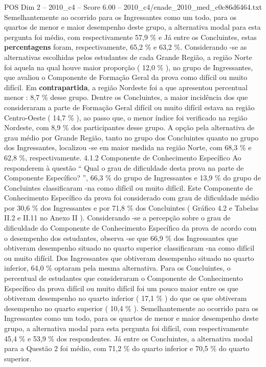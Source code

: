 \begin{textsample}{POS Dim 2 – 2010\_c4 – Score 6.00 – 2010\_c4/enade\_2010\_med\_c0c86d6464.txt}
Semelhantemente ao ocorrido para os Ingressantes como um todo, para os quartos de menor e maior desempenho deste grupo, a alternativa modal para esta pergunta foi médio, com respectivamente 57,9 \% e Já entre os Concluintes, estas \textbf{percentagens} foram, respectivamente, 65,2 \% e 63,2 \%.
Considerando -se as alternativas escolhidas pelos estudantes de cada Grande Região, a região Norte foi aquela na qual houve maior proporção ( 12,0 \% ), no grupo de Ingressantes, que avaliou o Componente de Formação Geral da prova como difícil ou muito difícil.
Em \textbf{contrapartida}, a região Nordeste foi a que apresentou percentual menor : 8,7 \% desse grupo.
Dentre os Concluintes, a maior incidência dos que consideraram a parte de Formação Geral difícil ou muito difícil estava na região Centro-Oeste ( 14,7 \% ), ao passo que, o menor índice foi verificado na região Nordeste, com 8,9 \% dos participantes desse grupo.
A opção pela alternativa de grau médio por Grande Região, tanto no grupo dos Concluintes quanto no grupo dos Ingressantes, localizou -se em maior medida na região Norte, com 68,3 \% e 62,8 \%, respectivamente. 4.1.2 Componente de Conhecimento Específico Ao responderem à questão “ Qual o grau de dificuldade desta prova na parte de Componente Específico? ”, 66,3 \% do grupo de Ingressantes e 13,9 \% do grupo de Concluintes classificaram -na como difícil ou muito difícil.
Este Componente de Conhecimento Específico da prova foi considerado com grau de dificuldade médio por 30,6 \% dos Ingressantes e por 71,8 \% dos Concluintes ( Gráfico 4.2 e Tabelas II.2 e II.11 no Anexo II ).
Considerando -se a percepção sobre o grau de dificuldade do Componente de Conhecimento Específico da prova de acordo com o desempenho dos estudantes, observa -se que 66,9 \% dos Ingressantes que obtiveram desempenho situado no quarto superior classificaram -na como difícil ou muito difícil.
Dos Ingressantes que obtiveram desempenho situado no quarto inferior, 64,0 \% optaram pela mesma alternativa.
Para os Concluintes, o percentual de estudantes que consideraram o Componente de Conhecimento Específico da prova difícil ou muito difícil foi um pouco maior entre os que obtiveram desempenho no quarto inferior ( 17,1 \% ) do que os que obtiveram desempenho no quarto superior ( 10,4 \% ).
Semelhantemente ao ocorrido para os Ingressantes como um todo, para os quartos de menor e maior desempenho deste grupo, a alternativa modal para esta pergunta foi difícil, com respectivamente 45,4 \% e 53,9 \% dos respondentes.
Já entre os Concluintes, a alternativa modal para a Questão 2 foi médio, com 71,2 \% do quarto inferior e 70,5 \% do quarto superior.

\end{textsample}
